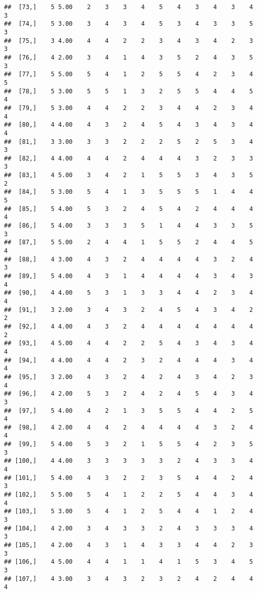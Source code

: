 \documentclass[]{article}
\begin{document}
\begin{verbatim}
##  [73,]    5 5.00    2    3    3    4    5    4    3    4    3    4    3
##  [74,]    5 3.00    3    4    3    4    5    3    4    3    3    5    3
##  [75,]    3 4.00    4    4    2    2    3    4    3    4    2    3    3
##  [76,]    4 2.00    3    4    1    4    3    5    2    4    3    5    3
##  [77,]    5 5.00    5    4    1    2    5    5    4    2    3    4    5
##  [78,]    5 3.00    5    5    1    3    2    5    5    4    4    5    4
##  [79,]    5 3.00    4    4    2    2    3    4    4    2    3    4    4
##  [80,]    4 4.00    4    3    2    4    5    4    3    4    3    4    4
##  [81,]    3 3.00    3    3    2    2    2    5    2    5    3    4    3
##  [82,]    4 4.00    4    4    2    4    4    4    3    2    3    3    3
##  [83,]    4 5.00    3    4    2    1    5    5    3    4    3    5    2
##  [84,]    5 3.00    5    4    1    3    5    5    5    1    4    4    5
##  [85,]    5 4.00    5    3    2    4    5    4    2    4    4    4    4
##  [86,]    5 4.00    3    3    3    5    1    4    4    3    3    5    3
##  [87,]    5 5.00    2    4    4    1    5    5    2    4    4    5    4
##  [88,]    4 3.00    4    3    2    4    4    4    4    3    2    4    3
##  [89,]    5 4.00    4    3    1    4    4    4    4    3    4    3    4
##  [90,]    4 4.00    5    3    1    3    3    4    4    2    3    4    4
##  [91,]    3 2.00    3    4    3    2    4    5    4    3    4    2    2
##  [92,]    4 4.00    4    3    2    4    4    4    4    4    4    4    2
##  [93,]    4 5.00    4    4    2    2    5    4    3    4    3    4    4
##  [94,]    4 4.00    4    4    2    3    2    4    4    4    3    4    4
##  [95,]    3 2.00    4    3    2    4    2    4    3    4    2    3    4
##  [96,]    4 2.00    5    3    2    4    2    4    5    4    3    4    3
##  [97,]    5 4.00    4    2    1    3    5    5    4    4    2    5    4
##  [98,]    4 2.00    4    4    2    4    4    4    4    3    2    4    4
##  [99,]    5 4.00    5    3    2    1    5    5    4    2    3    5    3
## [100,]    4 4.00    3    3    3    3    3    2    4    3    3    4    4
## [101,]    5 4.00    4    3    2    2    3    5    4    4    2    4    3
## [102,]    5 5.00    5    4    1    2    2    5    4    4    3    4    4
## [103,]    5 3.00    5    4    1    2    5    4    4    1    2    4    3
## [104,]    4 2.00    3    4    3    3    2    4    3    3    3    4    3
## [105,]    4 2.00    4    3    1    4    3    3    4    4    2    3    3
## [106,]    4 5.00    4    4    1    1    4    1    5    3    4    5    3
## [107,]    4 3.00    3    4    3    2    3    2    4    2    4    4    4

\end{verbatim}
\end{document}

